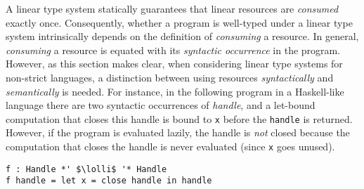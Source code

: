 \documentclass[acmsmall,review,anonymous]{acmart}
\newcommand{\lolli}{\multimap}
\begin{document}
A linear type system statically guarantees that linear resources are
\emph{consumed} exactly once. Consequently, whether a program is
well-typed under a linear type system intrinsically depends on the
definition of \emph{consuming} a resource.
In general, \emph{consuming} a resource is equated with its 
\emph{syntactic occurrence} in the program. However, as this section
makes clear, when considering linear type systems for non-strict
languages, a distinction between using
resources \emph{syntactically} and \emph{semantically} is needed.
%
For instance, in the following program in a Haskell-like language there are two
syntactic occurrences of \emph{handle}, and a let-bound computation that closes
this handle is bound to \lstinline{x} before the \lstinline{handle} is
returned. However, if the program is evaluated lazily, the handle is \emph{not}
closed because the computation that closes the handle is never evaluated (since
\lstinline{x} goes unused).
%
\begin{lstlisting}
f : Handle *' $\lolli$ '* Handle
f handle = let x = close handle in handle
\end{lstlisting}
%
%
%
%
%
%
%
%
%
%
\end{document}
